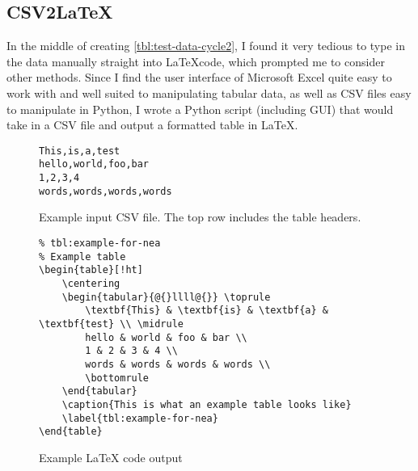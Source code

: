     \subsection{CSV2LaTeX}
        In the middle of creating \autoref{tbl:test-data-cycle2}, I found it very tedious to type in the data manually straight into \LaTeX code, which prompted me to consider other methods. 
        Since I find the user interface of Microsoft Excel quite easy to work with and well suited to manipulating tabular data, as well as CSV files easy to manipulate in Python, I wrote a Python script (including GUI) that would take in a CSV file and output a formatted table in \LaTeX. 

        \begin{figure}[!ht]
            \begin{verbatim}
This,is,a,test
hello,world,foo,bar
1,2,3,4
words,words,words,words
            \end{verbatim}
            \caption{Example input CSV file. The top row includes the table headers.}
            \label{pc:csv2latex-example-input-csv}
        \end{figure}


        \begin{figure}[!ht]
            \begin{verbatim}
% tbl:example-for-nea
% Example table
\begin{table}[!ht]
    \centering
    \begin{tabular}{@{}llll@{}} \toprule
        \textbf{This} & \textbf{is} & \textbf{a} & \textbf{test} \\ \midrule 
        hello & world & foo & bar \\ 
        1 & 2 & 3 & 4 \\ 
        words & words & words & words \\ 
        \bottomrule
    \end{tabular}
    \caption{This is what an example table looks like}
    \label{tbl:example-for-nea}
\end{table}
            \end{verbatim}
            \caption{Example LaTeX code output}
            \label{pc:csv2latex-example-output-latex}
        \end{figure}



